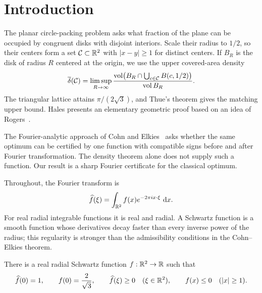 \section{Introduction}
\label{sec:introduction}

The planar circle-packing problem asks what fraction of the plane can be
occupied by congruent disks with disjoint interiors. Scale their radius
to $1/2$, so their centers form a set $\mathcal C\subset\mathbb R^2$ with
$|x-y|\ge1$ for distinct centers. If $B_R$ is the disk of radius $R$
centered at the origin, we use the upper covered-area density
\[
 \overline\delta(\mathcal C)
 =\limsup_{R\to\infty}
 \frac{\operatorname{vol}\bigl(B_R\cap\bigcup_{c\in\mathcal C}B(c,1/2)\bigr)}
      {\operatorname{vol} B_R}.
\]
The triangular lattice attains $\pi/(2\sqrt3)$, and Thue's theorem gives
the matching upper bound. Hales presents an elementary geometric proof
based on an idea of Rogers~\cite[pp.~442--443]{Hales2000}.

The Fourier-analytic approach of Cohn and Elkies~\cite{CohnElkies2003}
asks whether the same optimum can be certified by one function with
compatible signs before and after Fourier transformation. The density
theorem alone does not supply such a function. Our result is a sharp
Fourier certificate for the classical optimum.

Throughout, the Fourier transform is
\[
  \widehat f(\xi)=\int_{\mathbb R^2}f(x)e^{-2\pi i x\cdot\xi}\,\mathop{}\!\mathrm d x.
\]
For real radial integrable functions it is real and radial. A Schwartz
function is a smooth function whose derivatives decay faster than every
inverse power of the radius; this regularity is stronger than the
admissibility conditions in the Cohn--Elkies theorem.

\begin{theorem}\label{intro:main}
There is a real radial Schwartz function $f:\mathbb R^2\to\mathbb R$ such that
\begin{equation}\label{intro:conditions}
  \widehat f(0)=1,\qquad f(0)=\frac{2}{\sqrt3},\qquad
  \widehat f(\xi)\ge0\quad(\xi\in\mathbb R^2),\qquad
  f(x)\le0\quad(|x|\ge1).
\end{equation}
\end{theorem}

